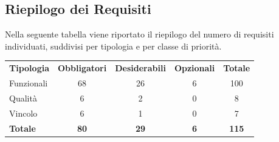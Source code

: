 \documentclass[a4paper, 11pt]{article}
\renewcommand{\arraystretch}{1.4} %
\begin{document}
\subsection{Riepilogo dei Requisiti}

Nella seguente tabella viene riportato il riepilogo del numero di requisiti individuati, suddivisi per tipologia e per classe di priorità.

\renewcommand{\arraystretch}{1.5}
\begin{table}[H]
    \centering
    \begin{tabular}{ l c c c c }
        \rowcolor{AccentDark}
        \color{white}\textbf{Tipologia} & \color{white}\textbf{Obbligatori} & \color{white}\textbf{Desiderabili} & \color{white}\textbf{Opzionali} & \color{white}\textbf{Totale} \\
        
        Funzionali & 68 & 26 & 6 & 100 \\
        Qualità    & 6  & 2  & 0 & 8  \\
        Vincolo    & 6  & 1  & 0 & 7  \\
        \textbf{Totale} & \textbf{80} & \textbf{29} & \textbf{6} & \textbf{115} \\
    \end{tabular}
    \label{tab:riepilogo-requisiti}
\end{table}
\end{document}

